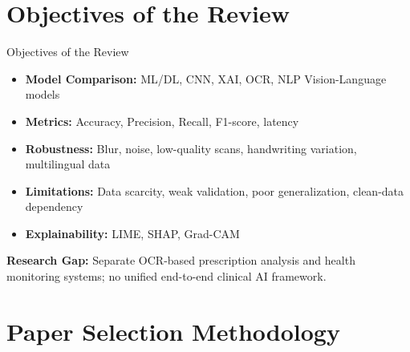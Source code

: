 \documentclass[11pt,aspectratio=169]{beamer}
\begin{document}
\section{Objectives of the Review}
\begin{frame}{Objectives of the Review}

\begin{itemize}
    \item \textbf{Model Comparison:} ML/DL, CNN, XAI, OCR, NLP Vision-Language models
    
    \item \textbf{Metrics:} Accuracy, Precision, Recall, F1-score, latency
    
    \item \textbf{Robustness:} Blur, noise, low-quality scans, handwriting variation, multilingual data
    
    \item \textbf{Limitations:} Data scarcity, weak validation, poor generalization, clean-data dependency
    
    \item \textbf{Explainability:} LIME, SHAP, Grad-CAM
\end{itemize}

\vspace{0.4cm}

\textbf{Research Gap:} Separate OCR-based prescription analysis and health monitoring systems; no unified end-to-end clinical AI framework.
\end{frame}





\section{Paper Selection Methodology}
\end{document}
